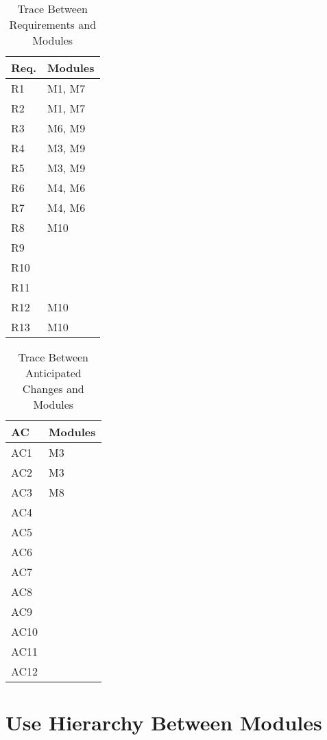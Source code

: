 \documentclass{article}
\begin{document}
\begin{table}[]
	\centering
	\begin{tabular}{p{} p{}}
		\toprule
		\textbf{Req.} & \textbf{Modules}\\
		\midrule
		R1 & M1, M7\\
		R2 & M1, M7\\
		R3 & M6, M9\\
		R4 & M3, M9\\
		R5 & M3, M9\\
		R6 & M4, M6\\
		R7 & M4, M6\\
		R8 & M10\\
		R9 & \\ %
		R10 & \\ %
		R11 & \\ %
		R12 & M10\\
		R13 & M10\\
		\bottomrule
	\end{tabular}
	\caption{Trace Between Requirements and Modules}
	
\end{table}

\begin{table}[]
	\centering
	\begin{tabular}{p{} p{}}
		\toprule
		\textbf{AC} & \textbf{Modules}\\
		\midrule
		AC1 & M3\\ %
		AC2 & M3\\
		AC3 & M8\\
		AC4 & \\
		AC5 & \\
		AC6 & \\
		AC7 & \\
		AC8 & \\
		AC9 & \\
		AC10 & \\
		AC11 & \\
		AC12 & \\
		
		\bottomrule
	\end{tabular}
	\caption{Trace Between Anticipated Changes and Modules}
	
\end{table}

\section*{Use Hierarchy Between Modules}
\end{document}
